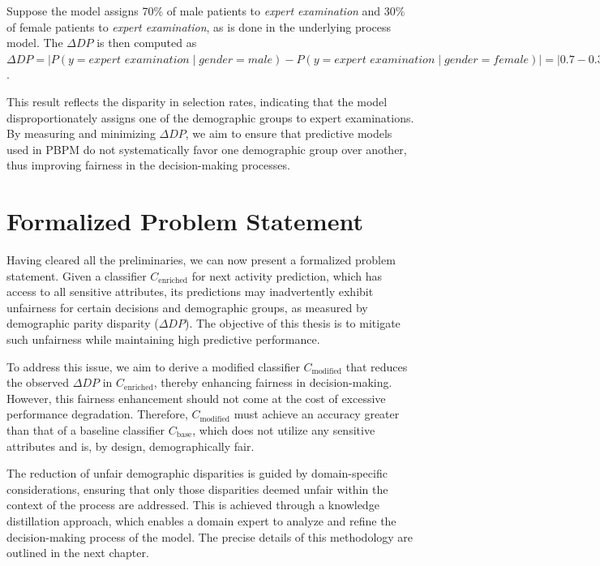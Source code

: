 Suppose the model assigns 70\% of male patients to \textit{expert examination} and 30\% of female patients to \textit{expert examination},
as is done in the underlying process model.
The $\Delta \textit{DP}$ is then computed as
$\Delta \textit{DP} =
\vert P(y = \textit{expert examination} \mid \textit{gender} = \textit{male}) - P(y = \textit{expert examination} \mid \textit{gender} = \textit{female}) \vert =
\vert 0.7 - 0.3 \vert = 0.4$.

This result reflects the disparity in selection rates, indicating that the model disproportionately assigns one of the demographic groups to expert examinations.
By measuring and minimizing $\Delta \textit{DP}$,
we aim to ensure that predictive models used in PBPM do not systematically favor one demographic group over another,
thus improving fairness in the decision-making processes.


\section{Formalized Problem Statement}
Having cleared all the preliminaries, we can now present a formalized problem statement.
Given a classifier $C_{\text{enriched}}$ for next activity prediction, which has access to all sensitive attributes,
its predictions may inadvertently exhibit unfairness for certain decisions and demographic groups,
as measured by demographic parity disparity ($\Delta \textit{DP}$).
The objective of this thesis is to mitigate such unfairness while maintaining high predictive performance.

To address this issue, we aim to derive a modified classifier $C_{\text{modified}}$
that reduces the observed $\Delta \textit{DP}$ in $C_{\text{enriched}}$, thereby enhancing fairness in decision-making.
However, this fairness enhancement should not come at the cost of excessive performance degradation.
Therefore, $C_{\text{modified}}$ must achieve an accuracy greater than that of a baseline classifier $C_{\text{base}}$,
which does not utilize any sensitive attributes and is, by design, demographically fair.

The reduction of unfair demographic disparities is guided by domain-specific considerations,
ensuring that only those disparities deemed unfair within the context of the process are addressed.
This is achieved through a knowledge distillation approach, which enables a domain expert to analyze and refine the decision-making process of the model.
The precise details of this methodology are outlined in the next chapter.
